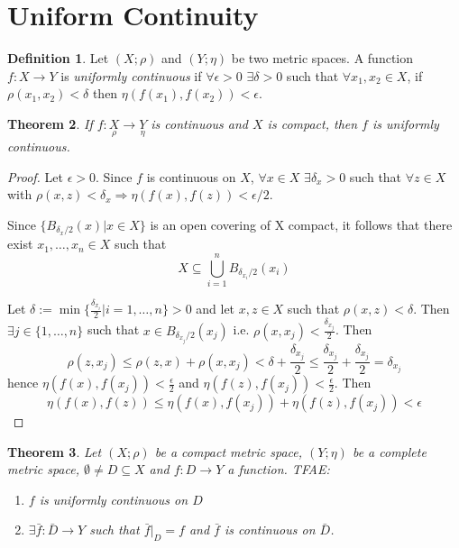 \documentclass[12pt]{amsbook}
\newtheorem{theorem}{Theorem}[section]
\theoremstyle{definition}
\newtheorem{definition}[theorem]{Definition}
\newcommand{\Ra}{\Rightarrow} %
\newcommand{\ra}{\rightarrow} %
\begin{document}
\section{Uniform Continuity}

\begin{definition}
Let $(X; \rho)$ and $(Y; \eta)$ be two metric spaces. A function $f: X \ra Y$ is \emph{uniformly continuous} if $\forall \epsilon > 0$ $\exists \delta > 0$ such that $\forall x_1, x_2 \in X$, if $\rho(x_1, x_2) < \delta$ then $\eta(f(x_1), f(x_2)) < \epsilon$.
\end{definition}

\begin{theorem}
If $f: \underset{\rho}X \ra \underset{\eta}Y$ is continuous and $X$ is compact, then $f$ is uniformly continuous.
\end{theorem}

\begin{proof}
Let $\epsilon > 0$. Since $f$ is continuous on $X$, $\forall x \in X$ $\exists \delta_x > 0$ such that $\forall z \in X$ with $\rho(x, z) < \delta_x \Ra \eta(f(x), f(z)) < \epsilon/2$.

Since $\{B_{\delta_x/2}(x) | x \in X\}$ is an open covering of X compact, it follows that there exist $x_1, \ldots, x_n \in X$ such that
\begin{equation*}
X \subseteq \bigcup_{i=1}^n B_{\delta_{x_i}/2}(x_i)
\end{equation*}

Let $\delta := \min \{\frac{\delta_{x_i}}{2} | i = 1, \ldots, n \} > 0$ and let $x, z \in X$ such that $\rho(x, z) < \delta$. Then $\exists j \in \{1, \ldots, n\}$ such that $x \in B_{\delta_{x_j}/2}(x_j)$ i.e. $\rho(x, x_j) < \frac{\delta_{x_j}}{2}$. Then
\begin{equation*}
\rho(z, x_j) \leq \rho(z, x) + \rho(x, x_j) < \delta + \frac{\delta_{x_j}}{2} \leq \frac{\delta_{x_j}}{2} + \frac{\delta_{x_j}}{2} = \delta_{x_j}
\end{equation*}
hence $\eta(f(x), f(x_j)) < \frac{\epsilon}{2}$ and $\eta(f(z), f(x_j)) < \frac{\epsilon}{2}$.
Then
\begin{equation*}
\eta(f(x), f(z)) \leq \eta(f(x), f(x_j)) + \eta(f(z), f(x_j)) < \epsilon
\end{equation*}
\end{proof}

\begin{theorem}
Let $(X; \rho)$ be a compact metric space, $(Y; \eta)$ be a complete metric space, $\emptyset \neq D \subseteq X$ and $f: D \ra Y$ a function. TFAE:
\begin{enumerate}
\item[(i)] $f$ is uniformly continuous on $D$
\item[(ii)] $\exists \bar f: \bar D \ra Y$ such that $\bar f|_D = f$ and $\bar f$ is continuous on $\bar D$.
\end{enumerate}
\end{theorem}
\end{document}
